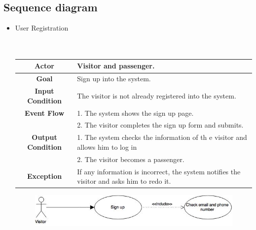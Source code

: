 \documentclass[18pt,oneside,a4paper, titlepage]{article}
\begin{document}
	\subsection{Sequence diagram}
	\begin{itemize}
		\item User Registration
		\\ \\ \\
		\begin{center}
			\centering
			
			\begin{tabular}{| c| p{8cm}|}
				\hline \textbf{Actor} &  Visitor and passenger.\\
				\hline \textbf{Goal} & Sign up into the system.\\
				\hline \textbf{Input Condition} & The visitor is not already registered into the system. \\
				\hline \textbf{Event Flow} & 1.	The system shows the sign up page.\\
				& 2. The visitor completes the sign up form and submits.	\\
				\hline \textbf{Output Condition} & 1. The system checks the information  of th e visitor and allows him to log in\\
				& 2. The visitor becomes a passenger.\\
				\hline \textbf{Exception} & If any information is incorrect, the system notifies the visitor and asks him to redo it.\\
				\hline
			\end{tabular}
			\vspace{4cm}
			\begin{figure}[h]
				\includegraphics[scale=0.71]{Diagrams/UseCaseSignup.jpg}
			\end{figure}
		\end{center}
		
		\newpage
		

\end{itemize}
\end{document}
